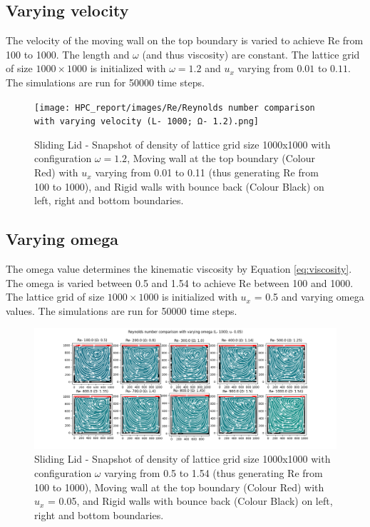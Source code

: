 \documentclass[a4paper,11pt]{report}
\begin{document}
\subsection{Varying velocity}
The velocity of the moving wall on the top boundary is varied to achieve Re from 100 to 1000. The length and $\omega$ (and thus viscosity) are constant. The lattice grid of size $1000\times1000$ is initialized with $\omega = 1.2$ and $u_x$ varying from $0.01$ to $0.11$. The simulations are run for 50000 time steps.

\begin{figure}[h!]
  \begin{center}
   \texttt{[image: HPC\_report/images/Re/Reynolds number comparison with varying velocity (L- 1000; Ω- 1.2).png]}
   \caption{Sliding Lid - Snapshot of density of lattice grid size 1000x1000 with configuration $\omega = 1.2$, Moving wall at the top boundary (Colour Red) with $u_x$ varying from 0.01 to 0.11 (thus generating Re from 100 to 1000), and Rigid walls with bounce back (Colour Black) on left, right and bottom boundaries.}
  \label{fig:re_velocity}
  \end{center}
\end{figure} 

\subsection{Varying omega}
The omega value determines the kinematic viscosity by Equation \ref{eq:viscosity}. The omega is varied between 0.5 and 1.54 to achieve Re between 100 and 1000. The lattice grid of size $1000\times1000$ is initialized with $u_x$ = 0.5 and varying omega values. The simulations are run for 50000 time steps.

\begin{figure}[h!]
  \begin{center}
   \includegraphics[width=\textwidth]{HPC_report/images/Re/Reynolds number comparison with varying omega (L- 1000; u- 0.05).png}
   \caption{Sliding Lid - Snapshot of density of lattice grid size 1000x1000 with configuration $\omega$ varying from 0.5 to 1.54 (thus generating Re from 100 to 1000), Moving wall at the top boundary (Colour Red) with $u_x$ = 0.05, and Rigid walls with bounce back (Colour Black) on left, right and bottom boundaries.}
  \label{fig:re_omega}
  \end{center}
\end{figure} 
\end{document}
